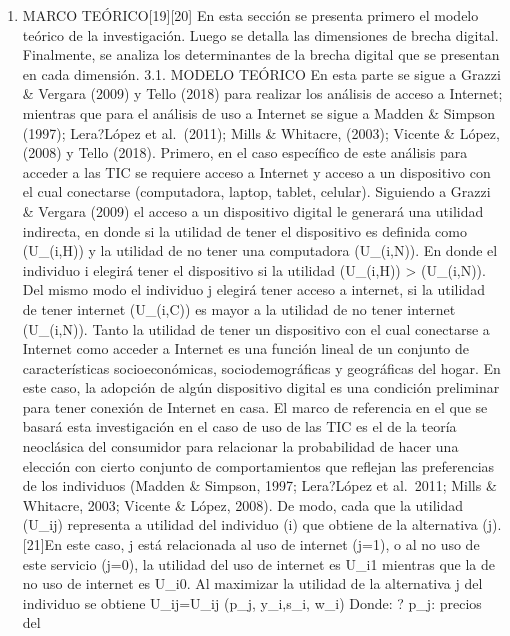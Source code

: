 \begin{enumerate}
\def\labelenumi{\arabic{enumi}.}
\setcounter{enumi}{2}
\item
  MARCO TEÓRICO{[}19{]}{[}20{]} En esta sección se presenta primero el
  modelo teórico de la investigación. Luego se detalla las dimensiones
  de brecha digital. Finalmente, se analiza los determinantes de la
  brecha digital que se presentan en cada dimensión. 3.1. MODELO TEÓRICO
  En esta parte se sigue a Grazzi \& Vergara (2009) y Tello (2018) para
  realizar los análisis de acceso a Internet; mientras que para el
  análisis de uso a Internet se sigue a Madden \& Simpson (1997);
  Lera?López et al.~(2011); Mills \& Whitacre, (2003); Vicente \& López,
  (2008) y Tello (2018). Primero, en el caso específico de este análisis
  para acceder a las TIC se requiere acceso a Internet y acceso a un
  dispositivo con el cual conectarse (computadora, laptop, tablet,
  celular). Siguiendo a Grazzi \& Vergara (2009) el acceso a un
  dispositivo digital le generará una utilidad indirecta, en donde si la
  utilidad de tener el dispositivo es definida como (U\_(i,H)) y la
  utilidad de no tener una computadora (U\_(i,N)). En donde el individuo
  i elegirá tener el dispositivo si la utilidad (U\_(i,H))
  \textgreater{} (U\_(i,N)). Del mismo modo el individuo j elegirá tener
  acceso a internet, si la utilidad de tener internet (U\_(i,C)) es
  mayor a la utilidad de no tener internet (U\_(i,N)). Tanto la utilidad
  de tener un dispositivo con el cual conectarse a Internet como acceder
  a Internet es una función lineal de un conjunto de características
  socioeconómicas, sociodemográficas y geográficas del hogar. En este
  caso, la adopción de algún dispositivo digital es una condición
  preliminar para tener conexión de Internet en casa. El marco de
  referencia en el que se basará esta investigación en el caso de uso de
  las TIC es el de la teoría neoclásica del consumidor para relacionar
  la probabilidad de hacer una elección con cierto conjunto de
  comportamientos que reflejan las preferencias de los individuos
  (Madden \& Simpson, 1997; Lera?López et al.~2011; Mills \& Whitacre,
  2003; Vicente \& López, 2008). De modo, cada que la utilidad (U\_ij)
  representa a utilidad del individuo (i) que obtiene de la alternativa
  (j). {[}21{]}En este caso, j está relacionada al uso de internet
  (j=1), o al no uso de este servicio (j=0), la utilidad del uso de
  internet es U\_i1 mientras que la de no uso de internet es U\_i0. Al
  maximizar la utilidad de la alternativa j del individuo se obtiene
  U\_ij=U\_ij (p\_j, y\_i,s\_i, w\_i) Donde: ? p\_j: precios del

\end{enumerate}
